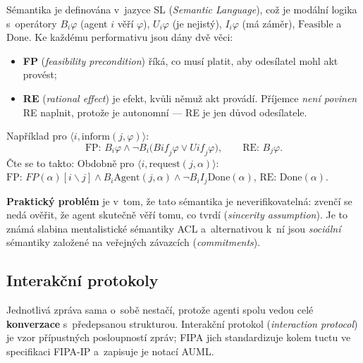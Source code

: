 \documentclass[11pt,a4paper]{article}
\theoremstyle{definition}
\begin{document}
\begin{defbox}
Sémantika je definována v~jazyce SL (\emph{Semantic Language}), což je modální logika
s~operátory $B_i\varphi$ (agent $i$ věří $\varphi$), $U_i\varphi$ (je nejistý),
$I_i\varphi$ (má záměr), $\mathrm{Feasible}$ a~$\mathrm{Done}$. Ke každému performativu jsou
dány dvě věci:
\begin{itemize}
\item \textbf{FP} (\emph{feasibility precondition}) říká, co musí platit, aby odesílatel mohl
  akt provést;
\item \textbf{RE} (\emph{rational effect}) je efekt, kvůli němuž akt provádí. Příjemce
  \emph{není povinen} RE naplnit, protože je autonomní --- RE je jen důvod odesílatele.
\end{itemize}
Například pro $\langle i, \mathrm{inform}(j,\varphi)\rangle$:
\[
\text{FP: } B_i\varphi \wedge \neg B_i\big(\mathit{Bif}_j\varphi \vee \mathit{Uif}_j\varphi\big),
\qquad
\text{RE: } B_j\varphi .
\]
Čte se to takto: 
Obdobně pro $\langle i, \mathrm{request}(j,\alpha)\rangle$:
$\text{FP: } \mathit{FP}(\alpha)[i \backslash j] \wedge B_i \mathrm{Agent}(j,\alpha)
\wedge \neg B_i I_j \mathrm{Done}(\alpha)$, $\text{RE: } \mathrm{Done}(\alpha)$.

\textbf{Praktický problém} je v~tom, že tato sémantika je neverifikovatelná: zvenčí se nedá
ověřit, že agent skutečně věří tomu, co tvrdí (\emph{sincerity assumption}). Je to známá slabina
mentalistické sémantiky ACL a~alternativou k~ní jsou \emph{sociální} sémantiky založené na
veřejných závazcích (\emph{commitments}).
\end{defbox}

\subsection{Interakční protokoly}

Jednotlivá zpráva sama o~sobě nestačí, protože agenti spolu vedou celé \textbf{konverzace}
s~předepsanou strukturou. Interakční protokol (\emph{interaction protocol}) je vzor přípustných
posloupností zpráv; FIPA jich standardizuje kolem tuctu ve specifikaci FIPA-IP a~zapisuje je
notací AUML.
\end{document}
